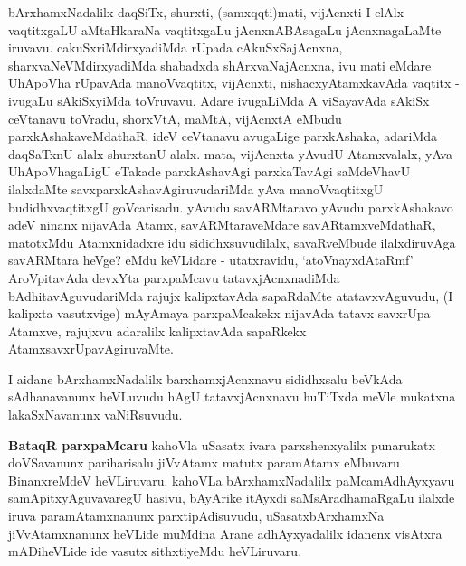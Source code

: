 \begin{artha}
bArxhamxNadalilx daqSiTx, shurxti, (samxqqti)mati, vijAcnxti I elAlx vaqtitxgaLU aMtaHkaraNa vaqtitxgaLu jAcnxnABAsagaLu jAcnxnagaLaMte iruvavu. cakuSxriMdirxyadiMda rUpada cAkuSxSajAcnxna, sharxvaNeVMdirxyadiMda shabadxda shArxvaNajAcnxna, ivu mati eMdare UhApoVha rUpavAda manoVvaqtitx, vijAcnxti, nishacxyAtamxkavAda vaqtitx - ivugaLu sAkiSxyiMda toVruvavu, Adare ivugaLiMda A viSayavAda sAkiSx ceVtanavu toVradu, shorxVtA, maMtA, vijAcnxtA eMbudu parxkAshakaveMdathaR, ideV ceVtanavu avugaLige parxkAshaka, adariMda daqSaTxnU alalx shurxtanU alalx. mata, vijAcnxta yAvudU Atamxvalalx, yAva UhApoVhagaLigU eTakade parxkAshavAgi parxkaTavAgi saMdeVhavU ilalxdaMte savxparxkAshavAgiruvudariMda yAva manoVvaqtitxgU budidhxvaqtitxgU goVcarisadu. yAvudu savARMtaravo yAvudu parxkAshakavo adeV ninanx nijavAda Atamx, savARMtaraveMdare savARtamxveMdathaR, matotxMdu Atamxnidadxre idu sididhxsuvudilalx, savaRveMbude ilalxdiruvAga savARMtara heVge? eMdu keVLidare - utatxravidu, `atoV\s nayxdAtaRmf' AroVpitavAda devxYta parxpaMcavu tatavxjAcnxnadiMda bAdhitavAguvudariMda rajujx kalipxtavAda sapaRdaMte atatavxvAguvudu, (I kalipxta vasutxvige) mAyAmaya parxpaMcakekx nijavAda tatavx savxrUpa Atamxve, rajujxvu adaralilx kalipxtavAda sapaRkekx AtamxsavxrUpavAgiruvaMte. 
\end{artha}


\begin{artha}
I aidane bArxhamxNadalilx barxhamxjAcnxnavu sididhxsalu beVkAda sAdhanavanunx heVLuvudu hAgU tatavxjAcnxnavu huTiTxda meVle mukatxna lakaSxNavanunx vaNiRsuvudu.
\end{artha}


\begin{artha}
{\bf BataqR parxpaMcaru} kahoVla uSasatx ivara parxshenxyalilx punarukatx doVSavanunx pariharisalu jiVvAtamx matutx paramAtamx eMbuvaru BinanxreMdeV heVLiruvaru. kahoVLa bArxhamxNadalilx paMcamAdhAyxyavu samApitxyAguvavaregU hasivu,  bAyArike itAyxdi saMsAradhamaRgaLu ilalxde iruva paramAtamxnanunx parxtipAdisuvudu, uSasatxbArxhamxNa jiVvAtamxnanunx heVLide muMdina Arane adhAyxyadalilx idanenx visAtxra mADiheVLide ide vasutx sithxtiyeMdu heVLiruvaru.
\end{artha}


